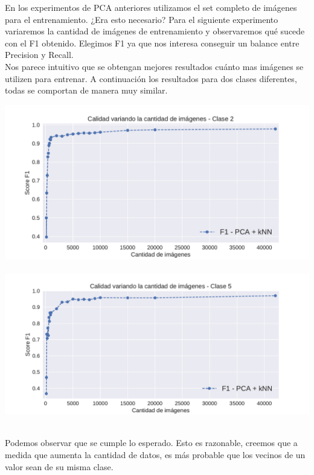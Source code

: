 En los experimentos de PCA anteriores utilizamos el set completo de imágenes para el entrenamiento. ¿Era esto necesario? Para el siguiente experimento variaremos la cantidad de imágenes de entrenamiento y observaremos qué sucede con el F1 obtenido. Elegimos F1 ya que nos interesa conseguir un balance entre Precision y Recall. \\

Nos parece intuitivo que se obtengan mejores resultados cuánto mas imágenes se utilizen para entrenar. A continuación los resultados para dos clases diferentes, todas se comportan de manera muy similar.

{\centering
    \includegraphics[scale=0.65]{informe/imagenes/cantimagenes/F1cantClase2REENTREGA.pdf} \\
}
$ $\newline
{\centering
    \includegraphics[scale=0.65]{informe/imagenes/cantimagenes/F1cantClase5REENTREGA.pdf} \\
}
$ $\newline

Podemos observar que se cumple lo esperado. Esto es razonable, creemos que a medida que aumenta la cantidad de datos, es más probable que los vecinos de un valor sean de su misma clase. \\

